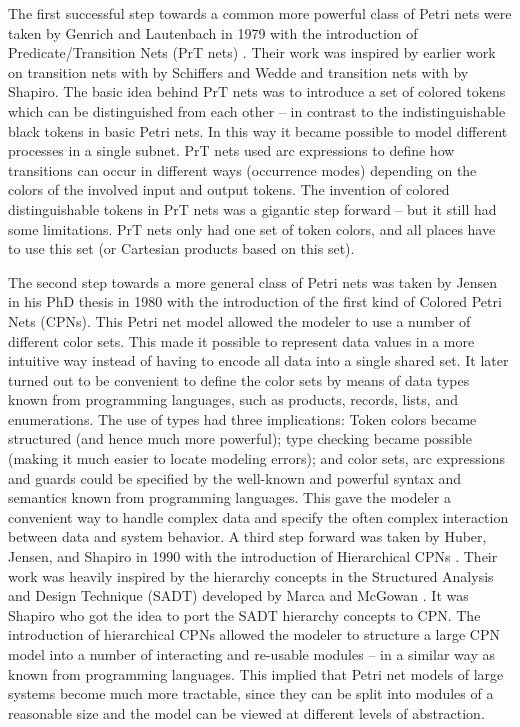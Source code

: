 The first successful step towards a common more powerful class of
Petri nets were taken by Genrich and Lautenbach in 1979 with the
introduction of Predicate/Transition Nets (PrT nets)
\cite{genrich:81}. Their work was inspired by earlier work on
transition nets with  by Schiffers and Wedde
\cite{schiffers:78} and transition nets with  \cite{shapiro:78} by Shapiro. The basic idea behind PrT
nets was to introduce a set of colored tokens which can be
distinguished from each other -- in contrast to the indistinguishable
black tokens in basic Petri nets. In this way it became possible to
model different processes in a single subnet. PrT nets used arc
expressions to define how transitions can occur in different ways
(occurrence modes) depending on the colors of the involved input and
output tokens. The invention of colored distinguishable tokens in PrT
nets was a gigantic step forward -- but it still had some
limitations. PrT nets only had one set of token colors, and all places
have to use this set (or Cartesian products based on this set).

The second step towards a more general class of Petri nets was taken
by Jensen in his PhD thesis in 1980 \cite{jensen:81} with the
introduction of the first kind of Colored Petri Nets (CPNs). This
Petri net model allowed the modeler to use a number of different color
sets. This made it possible to represent data values in a more
intuitive way instead of having to encode all data into a single
shared set. It later turned out to be convenient to define the color
sets by means of data types known from programming languages, such as
products, records, lists, and enumerations. The use of types had three
implications: Token colors became structured (and hence much more
powerful); type checking became possible (making it much easier to
locate modeling errors); and color sets, arc expressions and guards
could be specified by the well-known and powerful syntax and semantics
known from programming languages. This gave the modeler a convenient
way to handle complex data and specify the often complex interaction
between data and system behavior. A third step forward was taken by
Huber, Jensen, and Shapiro in 1990 with the introduction of
Hierarchical CPNs \cite{huber:91}. Their work was heavily inspired by
the hierarchy concepts in the Structured Analysis and Design Technique
(SADT) developed by Marca and McGowan \cite{sadt}. It was Shapiro who got
the idea to port the SADT hierarchy concepts to CPN.  The introduction
of hierarchical CPNs allowed the modeler to structure a large CPN
model into a number of interacting and re-usable modules -- in a
similar way as known from programming languages. This implied that
Petri net models of large systems become much more tractable, since
they can be split into modules of a reasonable size and the model can
be viewed at different levels of abstraction.


